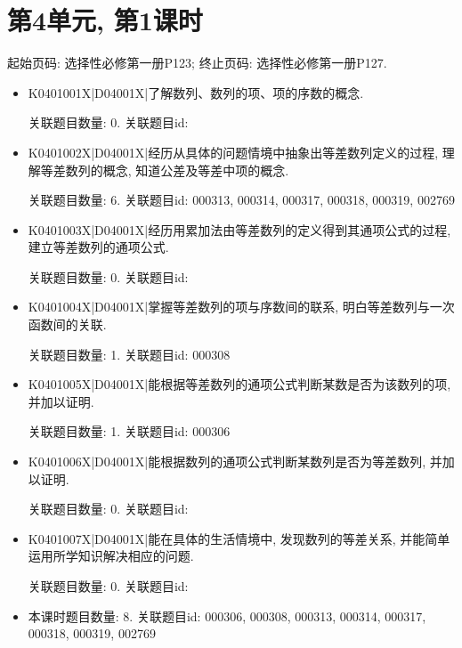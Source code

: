 \section*{第4单元, 第1课时}
起始页码: 选择性必修第一册P123; 终止页码: 选择性必修第一册P127.
\begin{itemize}
\item K0401001X|D04001X|了解数列、数列的项、项的序数的概念.

关联题目数量: 0. 关联题目id: 

\item K0401002X|D04001X|经历从具体的问题情境中抽象出等差数列定义的过程, 理解等差数列的概念, 知道公差及等差中项的概念.

关联题目数量: 6. 关联题目id: 000313, 000314, 000317, 000318, 000319, 002769

\item K0401003X|D04001X|经历用累加法由等差数列的定义得到其通项公式的过程, 建立等差数列的通项公式.

关联题目数量: 0. 关联题目id: 

\item K0401004X|D04001X|掌握等差数列的项与序数间的联系, 明白等差数列与一次函数间的关联.

关联题目数量: 1. 关联题目id: 000308

\item K0401005X|D04001X|能根据等差数列的通项公式判断某数是否为该数列的项, 并加以证明.

关联题目数量: 1. 关联题目id: 000306

\item K0401006X|D04001X|能根据数列的通项公式判断某数列是否为等差数列, 并加以证明.

关联题目数量: 0. 关联题目id: 

\item K0401007X|D04001X|能在具体的生活情境中, 发现数列的等差关系, 并能简单运用所学知识解决相应的问题.

关联题目数量: 0. 关联题目id: 

\item 本课时题目数量: 8. 关联题目id: 000306, 000308, 000313, 000314, 000317, 000318, 000319, 002769

\end{itemize}


